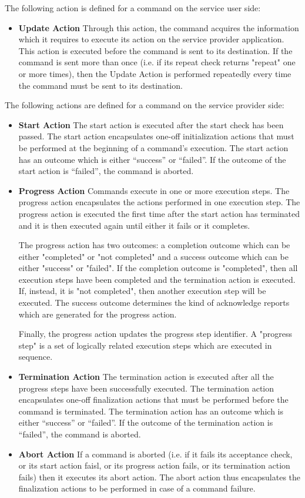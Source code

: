 The following action is defined for a command on the service user side:

\begin{itemize}
\item \textbf{Update Action}
Through this action, the command acquires the information which it requires to execute its action on the service provider application. This action is executed before the command is sent to its destination. If the command is sent more than once (i.e. if its repeat check returns "repeat" one or more times), then the Update Action is performed repeatedly every time the command must be sent to its destination.
\end{itemize} 

The following actions are defined for a command on the service provider side:

\begin{itemize}
\item \textbf{Start Action}
The start action is executed after the start check has been passed. The start action encapsulates one-off initialization actions that must be performed at the beginning of a command's execution. 
The start action has an outcome which is either “success” or “failed”. If the outcome of the start action is “failed”, the command is aborted. 
\item \textbf{Progress Action}
Commands execute in one or more execution steps. The progress action encapsulates the actions performed in one execution step. The progress action is executed the first time after the start action has terminated and it is then executed again until either it fails or it completes.
 
The progress action has two outcomes: a completion outcome which can be either "completed" or "not completed" and a success outcome which can be either "success" or "failed". If the completion outcome is "completed", then all execution steps have been completed and the termination action is executed. If, instead, it is "not completed", then another execution step will be executed. The success outcome determines the kind of acknowledge reports which are generated for the progress action. 

Finally, the progress action updates the progress step identifier. A "progress step" is a set of logically related execution steps which are executed in sequence.
\item \textbf{Termination Action}
The termination action is executed after all the progress steps have been successfully executed. The termination action encapsulates one-off finalization actions that must be performed before the command is terminated.
The termination action has an outcome which is either “success” or “failed”. If the outcome of the termination action is “failed”, the command is aborted. 
\item \textbf{Abort Action}
If a command is aborted (i.e. if it fails its acceptance check, or its start action faisl, or its progress action fails, or its termination action fails) then it executes its abort action. The abort action thus encapsulates the finalization actions to be performed in case of a command failure. 
\end{itemize}

